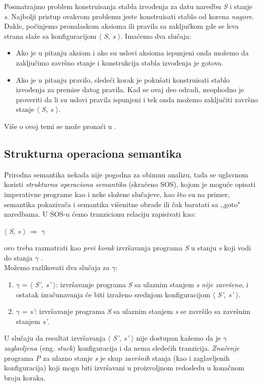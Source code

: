 \documentclass[a4paper]{article}
\begin{document}
{Posmatrajmo problem konstruisanja stabla izvođenja za datu naredbu \textit{S} i stanje \textit{s}. Najbolji pristup ovakvom problemu jeste konstruisati stablo od korena \textit{nagore}. Dakle, počinjemo pronalaskom aksioma ili pravila sa zaključkom gde se leva strana slaže sa konfiguracijom $\langle$ \textit{S, s} $\rangle$. Imaćemo dva slučaja:
\begin{itemize}
	\item Ako je u pitanju aksiom i ako su uslovi aksioma ispunjeni onda možemo da zaključimo završno stanje i konstrukcija stabla izvođenja je gotova.
	\item Ako je u pitanju pravilo, sledeći korak je pokušati konstruisati stablo izvođenja za premise datog pravila. Kad se ovaj deo odradi, neophodno je proveriti da li su uslovi pravila ispunjeni i tek onda možemo zaključiti završno stanje  $\langle$ \textit{S, s} $\rangle$.
\end{itemize}
Više o ovoj temi se može pronaći u \cite{willey, opersem}.

\subsection{Strukturna operaciona semantika}
Prirodna semantika nekada nije pogodna za obimnu analizu, tada se uglavnom koristi \textit{strukturna operaciona semantika} (skraćeno SOS), kojom je moguće opisati imperativne programe kao i neke složene slučajeve, kao što su na primer, semantika pokazivača i semantika višenitne obrade ili čak baratati sa ,,goto" naredbama. U SOS-u ćemo tranzicionu relaciju zapisivati kao:
\begin{center} $\langle$ \textit{S, s} $\rangle$ $\Longrightarrow$ \textit{$\gamma$} \end{center}
ovo treba razmatrati kao {\em prvi korak} izvršavanja programa \textit{S} u stanju \textit{s} koji vodi do stanja \textit{$\gamma$} \cite{opersem}.\\
Možemo razlikovati dva slučaja za $\gamma$:
\begin{enumerate}
	\item $\gamma$ = $\langle$ \textit{S', s'} $\rangle$: izvršavanje programa \textit{S} sa ulaznim stanjem \textit{s} {\em nije završeno}, i ostatak izračunavanja će biti izraženo srednjom konfiguracijom $\langle$ \textit{S', s'} $\rangle$.
	\item $\gamma$ = \textit{s'}: izvršavanje programa \textit{S} sa ulaznim stanjem \textit{s} se završilo sa završnim stanjem \textit{s'}.
\end{enumerate}
U slučaju da resultat izvršavanja $\langle$ \textit{S', s'} $\rangle$ nije dostupan kažemo da je $\gamma$ \textit{zaglavljena} (eng. {\em stuck}) konfiguracija i da nema sledećih tranzicija. \textit{Značenje} programa \textit{P} za ulazno stanje \textit{s} je skup \textit{završnih} stanja (kao i zaglavljenih konfiguracija) koji mogu biti izvršavani u proizvoljnom redosledu u konačnom broju koraka.

}
\end{document}
